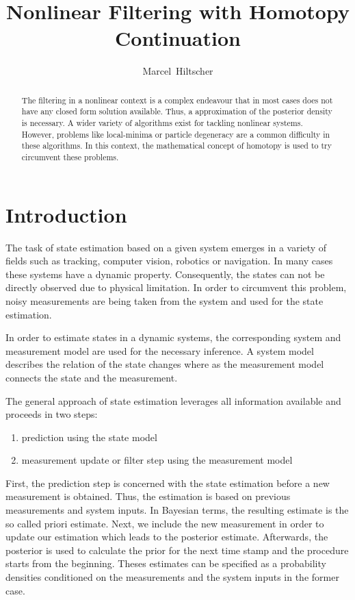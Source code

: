 \documentclass[a4paper]{IEEEtran}
\title{Nonlinear Filtering with Homotopy Continuation}
\author{Marcel~Hiltscher}
\begin{document}
\maketitle

\begin{abstract}
The filtering in a nonlinear context is a complex endeavour that in most cases does not have any closed form solution available. Thus, a approximation of the posterior density
is necessary. A wider variety of algorithms exist for tackling nonlinear systems. However, problems like local-minima or particle degeneracy are a common difficulty in these algorithms.
In this context, the mathematical concept of homotopy is used to try circumvent these problems. 
\end{abstract}

\section{Introduction}
\label{ch:intro}

The task of state estimation based on a given system emerges in a variety of fields such as tracking, computer vision, robotics or navigation.
In many cases these systems have a dynamic property. Consequently, the states can not be directly observed due to physical limitation. In order to 
circumvent this problem, noisy measurements are being taken from the system and used for the state estimation. 

In order to estimate states in a dynamic systems, the corresponding system and measurement model are used for the necessary inference. A system model describes the relation of the state changes where as the measurement
model connects the state and the measurement.

The general approach of state estimation leverages all information available and proceeds in two steps:
\begin{enumerate}
    \item prediction using the state model
    \item measurement update or filter step using the measurement model
\end{enumerate}

First, the prediction step is concerned with the state estimation before a new measurement is obtained. Thus, the estimation is based on previous measurements and system inputs.
In Bayesian terms, the resulting estimate is the so called priori estimate. Next, we include the new measurement in order to update our estimation which leads to the posterior estimate. 
Afterwards, the posterior is used to calculate the prior for the next time stamp and the procedure starts from the beginning. Theses estimates can be specified as a probability densities conditioned 
on the measurements and the system inputs in the former case.
\end{document}
